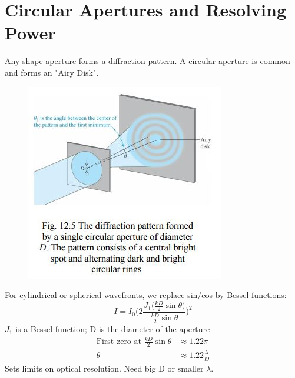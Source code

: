 \documentclass[a4paper, 11pt, normalem]{report}
\begin{document}
\section{Circular Apertures and Resolving Power}
Any shape aperture forms a diffraction pattern.
A circular aperture is common and forms an "Airy Disk".
\begin{figure}[H]
    \centering
    \includegraphics{Airy.jpg}
\end{figure}
For cylindrical or spherical wavefronts, we replace sin/cos by Bessel functions:
\begin{equation}
    I = I_{0}\Bigg(2\frac{J_{1}\big(\tfrac{kD}{2}\sin{\theta}\big)}{\tfrac{kD}{2}\sin{\theta}}\Bigg)^{2}
\end{equation}
$J_{1}$ is a Bessel function; D is the diameter of the aperture
\begin{align}
    \text{First zero at }\frac{kD}{2}\sin{\theta} &\approx 1.22\pi \\
    \theta &\approx 1.22\frac{\lambda}{D}
\end{align}
Sets limits on optical resolution.
Need big D or smaller $\lambda$.
\end{document}
